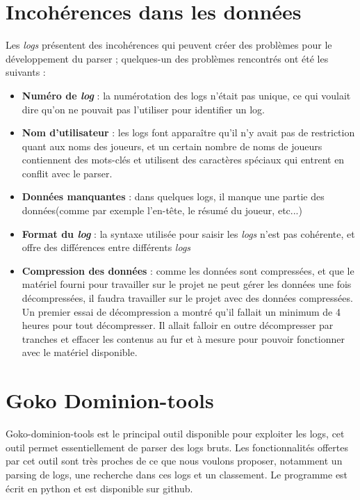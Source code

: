\section{Incohérences dans les données}
Les \textit{logs} présentent des incohérences qui peuvent créer des problèmes pour le développement du parser ; quelques-un des problèmes rencontrés ont été les suivants : 
\begin{itemize}
\item \textbf{Numéro de \textit{log}} : la numérotation des logs n'était pas unique, ce qui voulait dire qu'on ne pouvait pas l'utiliser pour identifier un log.
\item \textbf{Nom d'utilisateur} : les logs font apparaître qu'il n'y avait pas de restriction quant aux noms des joueurs, et un certain nombre de noms de joueurs contiennent des mots-clés et utilisent des caractères spéciaux qui entrent en conflit avec le parser. 
\item \textbf{Données manquantes} : dans quelques logs, il manque une partie des données(comme par exemple l'en-tête, le résumé du joueur, etc...)
\item \textbf{Format du \textit{log}} : la syntaxe utilisée pour saisir les \textit{logs} n'est pas cohérente, et offre des différences entre différents \textit{logs}
\item \textbf{Compression des données} : comme les données sont compressées, et que le matériel fourni pour travailler sur le projet ne peut gérer les données une fois décompressées, il faudra travailler sur le projet avec des données compressées. Un premier essai de décompression a montré qu'il fallait un minimum de 4 heures pour tout décompresser. Il allait falloir en outre décompresser par tranches et effacer les contenus au fur et à mesure pour pouvoir fonctionner avec le matériel disponible. 
\end{itemize}

\section{Goko Dominion-tools}

Goko-dominion-tools est le principal outil disponible pour exploiter les logs, cet outil permet essentiellement de parser des logs bruts. Les fonctionnalités offertes par cet outil sont très proches de ce que nous voulons proposer, notamment un parsing de logs, une recherche dans ces logs et un classement. Le programme est écrit en python et est disponible sur github.

